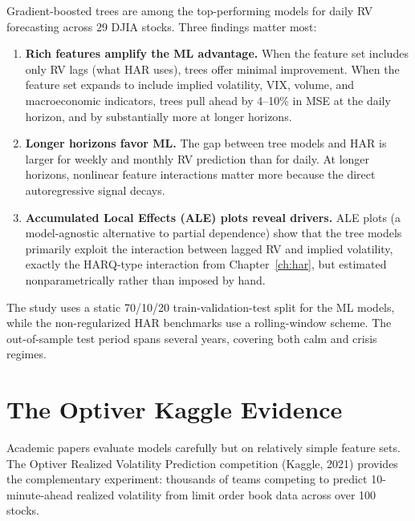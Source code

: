 \begin{keyresult}
Gradient-boosted trees are among the top-performing models for
daily RV forecasting across 29 DJIA stocks.  Three findings matter most:

\begin{enumerate}[leftmargin=1.8em]
\item \textbf{Rich features amplify the ML advantage.}
  When the feature set includes only RV lags (what HAR uses), trees offer
  minimal improvement.  When the feature set expands to include implied
  volatility, VIX, volume, and macroeconomic indicators, trees pull ahead
  by 4--10\% in MSE at the daily horizon, and by substantially more at
  longer horizons.

\item \textbf{Longer horizons favor ML.}
  The gap between tree models and HAR is larger for weekly and monthly RV
  prediction than for daily.  At longer horizons, nonlinear feature
  interactions matter more because the direct autoregressive signal decays.

\item \textbf{Accumulated Local Effects (ALE) plots reveal drivers.}
  ALE plots (a model-agnostic alternative to partial dependence) show that
  the tree models primarily exploit the interaction between lagged RV and
  implied volatility, exactly the HARQ-type interaction from
  Chapter~\ref{ch:har}, but estimated nonparametrically rather than
  imposed by hand.
\end{enumerate}
\end{keyresult}

The study uses a static 70/10/20 train-validation-test split for the ML
models, while the non-regularized HAR benchmarks use a rolling-window
scheme.  The out-of-sample test period spans several years, covering both
calm and crisis regimes.


\section{The Optiver Kaggle Evidence}\label{sec:trees:optiver}

Academic papers evaluate models carefully but on relatively simple feature
sets.  The Optiver Realized Volatility Prediction competition (Kaggle, 2021)
provides the complementary experiment: thousands of teams competing to
predict 10-minute-ahead realized volatility from limit order book data
across over 100 stocks.

